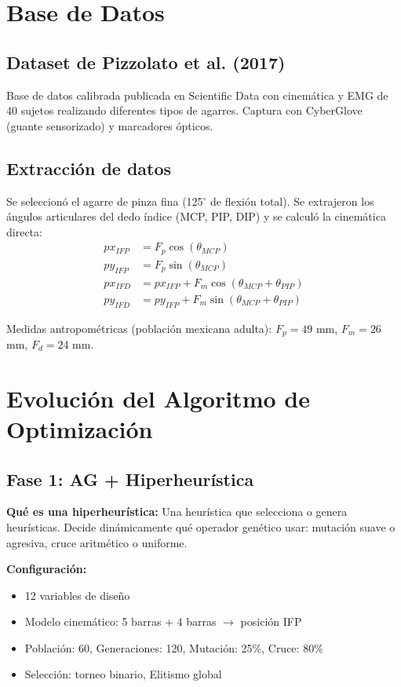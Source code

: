 \documentclass[11pt,letterpaper]{article}
\begin{document}
\section{Base de Datos}

\subsection{Dataset de Pizzolato et al. (2017)}
Base de datos calibrada publicada en Scientific Data con cinem\'atica y EMG de 40 sujetos realizando diferentes tipos de agarres. Captura con CyberGlove (guante sensorizado) y marcadores \'opticos.

\subsection{Extracci\'on de datos}
Se seleccion\'o el agarre de pinza fina (125$^\circ$ de flexi\'on total). Se extrajeron los \'angulos articulares del dedo \'indice (MCP, PIP, DIP) y se calcul\'o la cinem\'atica directa:
\begin{align}
px_{IFP} &= F_p \cos(\theta_{MCP}) \\
py_{IFP} &= F_p \sin(\theta_{MCP}) \\
px_{IFD} &= px_{IFP} + F_m \cos(\theta_{MCP} + \theta_{PIP}) \\
py_{IFD} &= py_{IFP} + F_m \sin(\theta_{MCP} + \theta_{PIP})
\end{align}

Medidas antropom\'etricas (poblaci\'on mexicana adulta): $F_p = 49$ mm, $F_m = 26$ mm, $F_d = 24$ mm.

\section{Evoluci\'on del Algoritmo de Optimizaci\'on}

\subsection{Fase 1: AG + Hiperheur\'istica}

\textbf{Qu\'e es una hiperheur\'istica:} Una heur\'istica que selecciona o genera heur\'isticas. Decide din\'amicamente qu\'e operador gen\'etico usar: mutaci\'on suave o agresiva, cruce aritm\'etico o uniforme.

\textbf{Configuraci\'on:}
\begin{itemize}
\item 12 variables de dise\~no
\item Modelo cinem\'atico: 5 barras + 4 barras $\rightarrow$ posici\'on IFP
\item Poblaci\'on: 60, Generaciones: 120, Mutaci\'on: 25\%, Cruce: 80\%
\item Selecci\'on: torneo binario, Elitismo global
\end{itemize}
\end{document}
